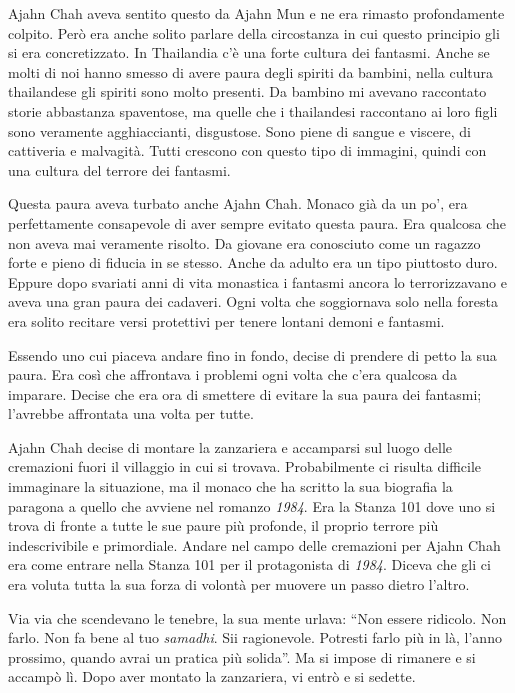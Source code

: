 Ajahn Chah aveva sentito questo da Ajahn Mun e ne era rimasto profondamente colpito. Però era anche solito parlare della circostanza in cui questo principio gli si era concretizzato. In Thailandia c'è una forte cultura dei fantasmi. Anche se molti di noi hanno smesso di avere paura degli spiriti da bambini, nella cultura thailandese gli spiriti sono molto presenti. Da bambino mi avevano raccontato storie abbastanza spaventose, ma quelle che i thailandesi raccontano ai loro figli sono veramente agghiaccianti, disgustose. Sono piene di sangue e viscere, di cattiveria e malvagità. Tutti crescono con questo tipo di immagini, quindi con una cultura del terrore dei fantasmi.

Questa paura aveva turbato anche Ajahn Chah. Monaco già da un po', era perfettamente consapevole di aver sempre evitato questa paura. Era qualcosa che non aveva mai veramente risolto. Da giovane era conosciuto come un ragazzo forte e pieno di fiducia in se stesso. Anche da adulto era un tipo piuttosto duro. Eppure dopo svariati anni di vita monastica i fantasmi ancora lo terrorizzavano e aveva una gran paura dei cadaveri. Ogni volta che soggiornava solo nella foresta era solito recitare versi protettivi per tenere lontani demoni e fantasmi.

Essendo uno cui piaceva andare fino in fondo, decise di prendere di petto la sua paura. Era così che affrontava i problemi ogni volta che c'era qualcosa da imparare. Decise che era ora di smettere di evitare la sua paura dei fantasmi; l'avrebbe affrontata una volta per tutte.

Ajahn Chah decise di montare la zanzariera e accamparsi sul luogo delle cremazioni fuori il villaggio in cui si trovava. Probabilmente ci risulta difficile immaginare la situazione, ma il monaco che ha scritto la sua biografia la paragona a quello che avviene nel romanzo \textit{1984}. Era la Stanza 101 dove uno si trova di fronte a tutte le sue paure più profonde, il proprio terrore più indescrivibile e primordiale. Andare nel campo delle cremazioni per Ajahn Chah era come entrare nella Stanza 101 per il protagonista di \textit{1984}. Diceva che gli ci era voluta tutta la sua forza di volontà per muovere un passo dietro l'altro. 

Via via che scendevano le tenebre, la sua mente urlava: ``Non essere ridicolo. Non farlo. Non fa bene al tuo \textit{samadhi}. Sii ragionevole. Potresti farlo più in là, l'anno prossimo, quando avrai un pratica più solida''. Ma si impose di rimanere e si accampò lì. Dopo aver montato la zanzariera, vi entrò e si sedette.


